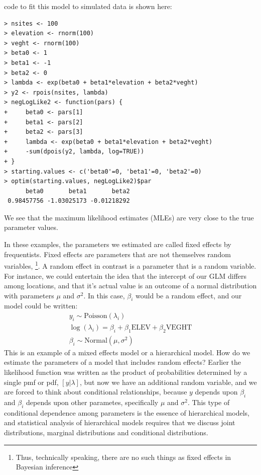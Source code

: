 code to fit this model to simulated data is shown here:
\begin{verbatim}
> nsites <- 100
> elevation <- rnorm(100)
> veght <- rnorm(100)
> beta0 <- 1
> beta1 <- -1
> beta2 <- 0
> lambda <- exp(beta0 + beta1*elevation + beta2*veght)
> y2 <- rpois(nsites, lambda)
> negLogLike2 <- function(pars) {
+     beta0 <- pars[1]
+     beta1 <- pars[2]
+     beta2 <- pars[3]
+     lambda <- exp(beta0 + beta1*elevation + beta2*veght)
+     -sum(dpois(y2, lambda, log=TRUE))
+ }
> starting.values <- c('beta0'=0, 'beta1'=0, 'beta2'=0)
> optim(starting.values, negLogLike2)$par
      beta0       beta1       beta2
 0.98457756 -1.03025173 -0.01218292
\end{verbatim}
We see that the maximum likelihood estimates (MLEs) are very close to
the true parameter values.

In these examples, the parameters we estimated are called fixed
effects by frequentists. Fixed effects are parameters that are not
themselves random variables,
\footnote{Thus, technically speaking, there are no such
  things as fixed effects in Bayesian inference}. A random effect in
contrast is a parameter that is a random variable. For instance,
we could entertain the idea that the intercept of our GLM differs
among locations, and that it's actual value is an outcome of a normal
distribution with parameters $\mu$ and $\sigma^2$. In this case,
$\beta_i$ would be a random effect, and our model could be written:
\begin{gather}
y_i \sim \text{Poisson}(\lambda_i) \\
\log(\lambda_i) = \beta_i + \beta_1\text{ELEV} + \beta_2\text{VEGHT} \\
\beta_i \sim \text{Normal}(\mu, \sigma^2)
\end{gather}
This is an example of a mixed effects model or a hierarchical
model. How do we estimate the parameters of a model that includes
random effects? Earlier the likelihood function was written as the
product of probabilities determined by a single pmf or pdf,
$[y|\lambda]$, but now we have an additional random variable, and we
are forced to think about conditional relationships, because $y$
depends upon $\beta_i$ and $\beta_i$ depends upon other parametes,
specifically $\mu$ and $\sigma^2$.
This type of conditional dependence among parameters is the essence of hierarchical
models, and statistical analysis of hierarchical models requires that
we discuss joint distributions, marginal distributions and conditional
distributions.



